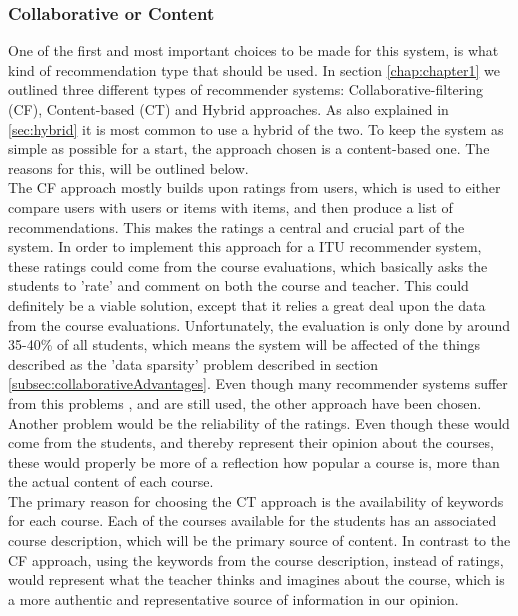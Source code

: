 \subsubsection*{Collaborative or Content}
One of the first and most important choices to be made for this system, is what kind of recommendation type that should be used. In section \ref{chap:chapter1} we outlined three different types of recommender systems: Collaborative-filtering (CF), Content-based (CT) and Hybrid approaches. As also explained in \ref{sec:hybrid} it is most common to use a hybrid of the two. To keep the system as simple as possible for a start, the approach chosen is a content-based one. The reasons for this, will be outlined below. \\
The CF approach mostly builds upon ratings from users, which is used to either compare users with users or items with items, and then produce a list of recommendations. This makes the ratings a central and crucial part of the system. In order to implement this approach for a ITU recommender system, these ratings could come from the course evaluations, which basically asks the students to 'rate' and comment on both the course and teacher. This could definitely be a viable solution, except that it relies a great deal upon the data from the course evaluations. Unfortunately, the evaluation is only done by around 35-40\% of all students, which means the system will be affected of the things described as the 'data sparsity' problem described in section \ref{subsec:collaborativeAdvantages}. Even though many recommender systems suffer from this problems , and are still used, the other approach have been chosen.\newline 
Another problem would be the reliability of the ratings. Even though these would come from the students, and thereby represent their opinion about the courses, these would properly be more of a reflection how popular a course is, more than the actual content of each course.\\ 
The primary reason for choosing the CT approach is the availability of keywords for each course. Each of the courses available for the students has an associated course description, which will be the primary source of content. In contrast to the CF approach, using the keywords from the course description, instead of ratings, would represent what the teacher thinks and imagines about the course, which is a more authentic and representative source of information in our opinion. 


